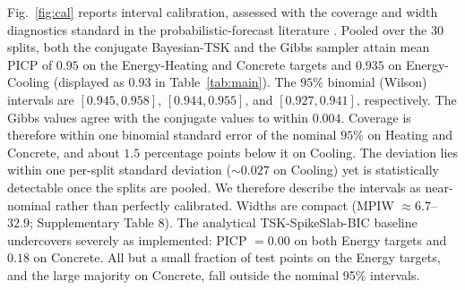 \documentclass[review,1p,times]{elsarticle}
\begin{document}
Fig.~\ref{fig:cal} reports interval calibration, assessed with the coverage and width diagnostics standard in the probabilistic-forecast literature \cite{gneiting2007strictly}.
Pooled over the 30 splits, both the conjugate Bayesian-TSK and the Gibbs sampler attain mean PICP of $0.95$ on the Energy-Heating and Concrete targets and $0.935$ on Energy-Cooling (displayed as $0.93$ in Table~\ref{tab:main}).
The $95\%$ binomial (Wilson) intervals are $[0.945, 0.958]$, $[0.944, 0.955]$, and $[0.927, 0.941]$, respectively.
The Gibbs values agree with the conjugate values to within $0.004$.
Coverage is therefore within one binomial standard error of the nominal $95\%$ on Heating and Concrete, and about $1.5$ percentage points below it on Cooling.
The deviation lies within one per-split standard deviation ($\sim0.027$ on Cooling) yet is statistically detectable once the splits are pooled.
We therefore describe the intervals as near-nominal rather than perfectly calibrated. Widths are compact (MPIW $\approx6.7$--$32.9$; Supplementary Table 8).
The analytical TSK-SpikeSlab-BIC baseline undercovers severely as implemented: PICP $=0.00$ on both Energy targets and $0.18$ on Concrete.
All but a small fraction of test points on the Energy targets, and the large majority on Concrete, fall outside the nominal 95\% intervals.
\end{document}
